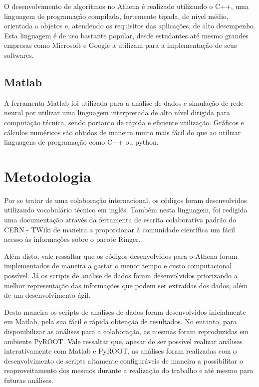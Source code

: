 \documentclass[a4paper,10pt,titlepage]{article}
\begin{document}
O desenvolvimento de algoritmos no Athena é realizado utilizando o C++, uma linguagem de programação compilada, fortemente tipada, de nível médio, orientada a objetos e, atendendo os requisitos das aplicações, de alto desempenho.
Esta linguagem é de uso bastante popular, desde estudantes até mesmo grandes empresas como Microsoft e Google a utilizam para a implementação de seus softwares.

\subsection{Matlab}

A ferramenta Matlab foi utilizada para a análise de dados e simulação de rede neural por utilizar uma linguagem interpretada de alto nível dirigida para computação técnica, sendo portanto de rápida e eficiente utilização.
Gráficos e cálculos numéricos são obtidos de maneira muito mais fácil do que ao utilizar linguagens de programação como C++ ou python.

\section{Metodologia}

Por se tratar de uma colaboração internacional, os códigos foram desenvolvidos utilizando vocabulário técnico em inglês.
Também nesta linguagem, foi redigida uma documentação através da ferramenta de escrita colaborativa padrão do CERN - TWiki de maneira a proporcionar à comunidade científica um fácil acesso às informações sobre o pacote Ringer.

Além disto, vale ressaltar que os códigos desenvolvidos para o Athena foram implementados de maneira a gastar o menor tempo e custo computacional possível.
Já os scripts de análise de dados foram desenvolvidos priorizando a melhor representação das informações que podem ser extraídas dos dados, além de um desenvolvimento ágil.

Desta maneira os scripts de análises de dados foram desenvolvidos inicialmente em Matlab, pela sua fácil e rápida obtenção de resultados.
No entanto, para disponibilizar as análises para a colaboração, as mesmas foram reproduzidas em ambiente PyROOT.
Vale ressaltar que, apesar de ser possível realizar análises interativamente com Matlab e PyROOT, as análises foram realizadas com o desenvolvimento de scripts altamente configuráveis de maneira a possibilitar o reaproveitamento dos mesmos durante a realização do trabalho e até mesmo para futuras análises.
\end{document}
